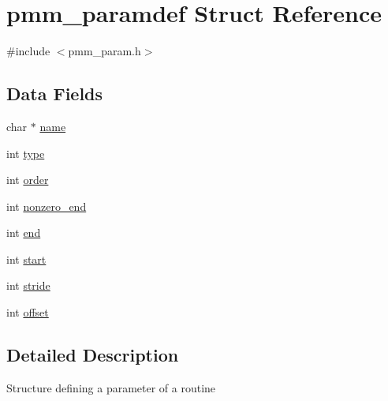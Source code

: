 \hypertarget{structpmm__paramdef}{\section{pmm\-\_\-paramdef Struct Reference}
\label{structpmm__paramdef}
}


{\ttfamily \#include $<$pmm\-\_\-param.\-h$>$}

\subsection*{Data Fields}
\begin{DoxyCompactItemize}
\item 
char $\ast$ \hyperlink{structpmm__paramdef_a2fd54ad669ea6676bc54e3a8c0ccc063}{name}
\item 
int \hyperlink{structpmm__paramdef_a9574b1c9c8b8fdf6fbaec045f11c9b09}{type}
\item 
int \hyperlink{structpmm__paramdef_a37daef9b55c74e8bf65821d5b8f31afa}{order}
\item 
int \hyperlink{structpmm__paramdef_ac48fd1f2b85c4c705bff24e1455be42b}{nonzero\-\_\-end}
\item 
int \hyperlink{structpmm__paramdef_aeefe385ef1f9223ce7b9917ffe846737}{end}
\item 
int \hyperlink{structpmm__paramdef_a832e0696b11902af685bca8e8ca99c57}{start}
\item 
int \hyperlink{structpmm__paramdef_aa6d5577edc2faf9df52ffbcd5c8cce67}{stride}
\item 
int \hyperlink{structpmm__paramdef_aa41fd62c9db57508f30397eaedfe5a86}{offset}
\end{DoxyCompactItemize}


\subsection{Detailed Description}
Structure defining a parameter of a routine 

